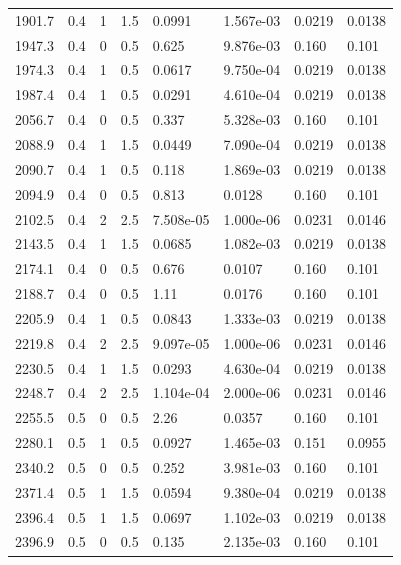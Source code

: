 \documentclass[preview]{standalone}
\begin{document}
{{{\begin{tabular}{L{1.2cm}C{1.2cm} C{0.3cm}C{0.5cm} C{1.4cm}C{1.4cm} C{1.4cm}C{1.4cm}}
  1901.7  &   0.4  & 1     & 1.5 &  0.0991  & 1.567e-03  & 0.0219 &  0.0138   \\ 
  1947.3  &   0.4  & 0     & 0.5 &  0.625  & 9.876e-03  & 0.160 &  0.101   \\ 
  1974.3  &   0.4  & 1     & 0.5 &  0.0617  & 9.750e-04  & 0.0219 &  0.0138   \\ 
  1987.4  &   0.4  & 1     & 0.5 &  0.0291  & 4.610e-04  & 0.0219 &  0.0138   \\ 
  2056.7  &   0.4  & 0     & 0.5 &  0.337  & 5.328e-03  & 0.160 &  0.101   \\ 
  2088.9  &   0.4  & 1     & 1.5 &  0.0449  & 7.090e-04  & 0.0219 &  0.0138   \\ 
  2090.7  &   0.4  & 1     & 0.5 &  0.118  & 1.869e-03  & 0.0219 &  0.0138   \\ 
  2094.9  &   0.4  & 0     & 0.5 &  0.813  & 0.0128  & 0.160 &  0.101   \\ 
  2102.5  &   0.4  & 2     & 2.5 &  7.508e-05  & 1.000e-06  & 0.0231 &  0.0146   \\ 
  2143.5  &   0.4  & 1     & 1.5 &  0.0685  & 1.082e-03  & 0.0219 &  0.0138   \\ 
  2174.1  &   0.4  & 0     & 0.5 &  0.676  & 0.0107  & 0.160 &  0.101   \\ 
  2188.7  &   0.4  & 0     & 0.5 &  1.11  & 0.0176  & 0.160 &  0.101   \\ 
  2205.9  &   0.4  & 1     & 0.5 &  0.0843  & 1.333e-03  & 0.0219 &  0.0138   \\ 
  2219.8  &   0.4  & 2     & 2.5 &  9.097e-05  & 1.000e-06  & 0.0231 &  0.0146   \\ 
  2230.5  &   0.4  & 1     & 1.5 &  0.0293  & 4.630e-04  & 0.0219 &  0.0138   \\ 
  2248.7  &   0.4  & 2     & 2.5 &  1.104e-04  & 2.000e-06  & 0.0231 &  0.0146   \\ 
  2255.5  &   0.5  & 0     & 0.5 &  2.26  & 0.0357  & 0.160 &  0.101   \\ 
  2280.1  &   0.5  & 1     & 0.5 &  0.0927  & 1.465e-03  & 0.151 &  0.0955   \\ 
  2340.2  &   0.5  & 0     & 0.5 &  0.252  & 3.981e-03  & 0.160 &  0.101   \\ 
  2371.4  &   0.5  & 1     & 1.5 &  0.0594  & 9.380e-04  & 0.0219 &  0.0138   \\ 
  2396.4  &   0.5  & 1     & 1.5 &  0.0697  & 1.102e-03  & 0.0219 &  0.0138   \\ 
  2396.9  &   0.5  & 0     & 0.5 &  0.135  & 2.135e-03  & 0.160 &  0.101   \\ 

\end{tabular}}}}
\end{document}

